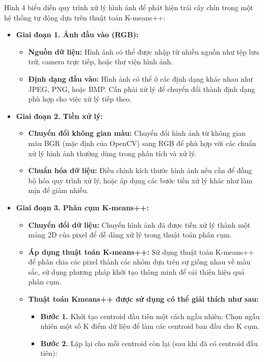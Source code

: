\documentclass[a4paper]{article}
\begin{document}
Hình 4 biểu diễn quy trình xử lý hình ảnh để phát hiện trái cây chín trong một hệ thống tự động dựa trên thuật toán K-means++:
\begin{itemize}[label={}]
    \item \textbf{Giai đoạn 1. Ảnh đầu vào (RGB):} 
    \begin{itemize}[label={}]
        \item \textbf{Nguồn dữ liệu:} Hình ảnh có thể được nhập từ nhiều nguồn như tệp lưu trữ, camera trực tiếp, hoặc thư viện hình ảnh. 
        \item  \textbf{Định dạng đầu vào:} Hình ảnh có thể ở các định dạng khác nhau như JPEG, PNG, hoặc BMP. Cần phải xử lý để chuyển đổi thành định dạng phù hợp cho việc xử lý tiếp theo.
    \end{itemize}
    \item \textbf{Giai đoạn 2. Tiền xử lý: }
    \begin{itemize}[label={}]
        \item \textbf{Chuyển đổi không gian màu:} Chuyển đổi hình ảnh từ không gian màu BGR (mặc định của OpenCV) sang RGB để phù hợp với các chuẩn xử lý hình ảnh thường dùng trong phân tích và xử lý.
        \item \textbf{Chuẩn hóa dữ liệu:} Điều chỉnh kích thước hình ảnh nếu cần để đồng bộ hóa quy trình xử lý, hoặc áp dụng các bước tiền xử lý khác như làm mịn để giảm nhiễu.
    \end{itemize}
    \item  \textbf{Giai đoạn 3. Phân cụm K-means++: }
    \begin{itemize}[label={}]
        \item \textbf{Chuyển đổi dữ liệu:} Chuyển hình ảnh đã được tiền xử lý thành một mảng 2D của pixel để dễ dàng xử lý trong thuật toán phân cụm.
        \item \textbf{Áp dụng thuật toán K-means++:} Sử dụng thuật toán K-means++ để phân chia các pixel thành các nhóm dựa trên sự giống nhau về màu sắc, sử dụng phương pháp khởi tạo thông minh để cải thiện hiệu quả phân cụm.
        \item \textbf{Thuật toán Kmeans++ được sử dụng có thể giải thích như sau: }
        \begin{itemize}[label={}]
            \item \textbf{Bước 1. }Khởi tạo centroid đầu tiên một cách ngẫu nhiên: Chọn ngẫu nhiên một số K điểm dữ liệu để làm các centroid ban đầu cho K cụm.
            \item \textbf{Bước 2. }Lặp lại cho mỗi centroid còn lại (sau khi đã có centroid đầu tiên):

\end{itemize}
\end{itemize}
\end{itemize}
\end{document}
